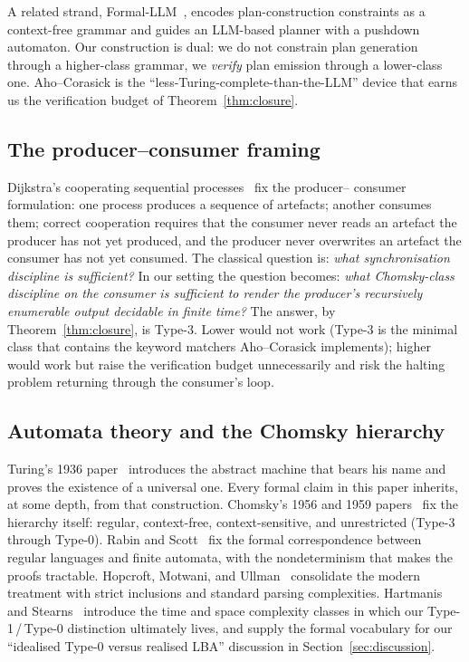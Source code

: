 A related strand, Formal-LLM~\cite{li2024formalllm}, encodes
plan-construction constraints as a context-free grammar and
guides an LLM-based planner with a pushdown automaton.  Our
construction is dual:  we do not constrain plan generation
through a higher-class grammar, we \emph{verify} plan emission
through a lower-class one.  Aho--Corasick is the
``less-Turing-complete-than-the-LLM'' device that earns us the
verification budget of Theorem~\ref{thm:closure}.

\subsection{The producer--consumer framing}

Dijkstra's cooperating sequential
processes~\cite{dijkstra1968cooperating} fix the producer--
consumer formulation:  one process produces a sequence of
artefacts; another consumes them; correct cooperation requires
that the consumer never reads an artefact the producer has not
yet produced, and the producer never overwrites an artefact the
consumer has not yet consumed.  The classical question is:
\emph{what synchronisation discipline is sufficient?}  In our
setting the question becomes: \emph{what Chomsky-class discipline
on the consumer is sufficient to render the producer's
recursively enumerable output decidable in finite time?}  The
answer, by Theorem~\ref{thm:closure}, is Type-3.  Lower would not
work (Type-3 is the minimal class that contains the keyword
matchers Aho--Corasick implements); higher would work but raise
the verification budget unnecessarily and risk the halting
problem returning through the consumer's loop.

\subsection{Automata theory and the Chomsky hierarchy}

Turing's 1936 paper~\cite{turing1936computable} introduces the
abstract machine that bears his name and proves the existence of
a universal one.  Every formal claim in this paper inherits, at
some depth, from that construction.  Chomsky's 1956 and 1959
papers~\cite{chomsky1956three,chomsky1959certain} fix the
hierarchy itself: regular, context-free, context-sensitive, and
unrestricted (Type-3 through Type-0).  Rabin and
Scott~\cite{rabin1959finite} fix the formal correspondence
between regular languages and finite automata, with the
nondeterminism that makes the proofs tractable.  Hopcroft,
Motwani, and Ullman~\cite{hopcroft2006automata} consolidate the
modern treatment with strict inclusions and standard parsing
complexities.  Hartmanis and
Stearns~\cite{hartmanis1965computational} introduce the time and
space complexity classes in which our Type-1\,/\,Type-0 distinction
ultimately lives, and supply the formal vocabulary for our
``idealised Type-0 versus realised LBA'' discussion in
Section~\ref{sec:discussion}.

